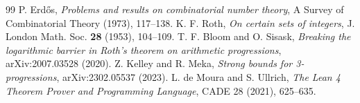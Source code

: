 \documentclass[11pt,a4paper]{article}
\theoremstyle{definition}
\begin{document}
\begin{thebibliography}{99}
 P. Erd\H{o}s, \textit{Problems and results on combinatorial number theory}, A Survey of Combinatorial Theory (1973), 117--138.
 K. F. Roth, \textit{On certain sets of integers}, J. London Math. Soc. \textbf{28} (1953), 104--109.
 T. F. Bloom and O. Sisask, \textit{Breaking the logarithmic barrier in Roth's theorem on arithmetic progressions}, arXiv:2007.03528 (2020).
 Z. Kelley and R. Meka, \textit{Strong bounds for 3-progressions}, arXiv:2302.05537 (2023).
 L. de Moura and S. Ullrich, \textit{The Lean 4 Theorem Prover and Programming Language}, CADE 28 (2021), 625--635.
\end{thebibliography}
\end{document}
